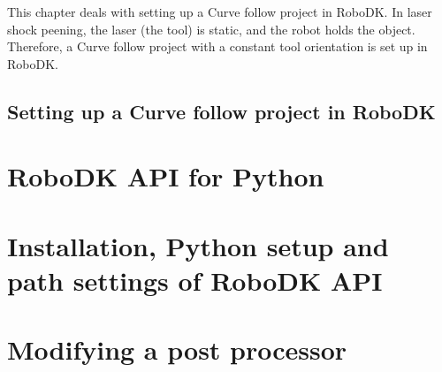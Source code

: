 This chapter deals with setting up a Curve follow project in RoboDK. In laser shock peening, the laser (the tool) is static, and the robot holds the object. Therefore, a Curve follow project with a constant tool orientation is set up in RoboDK.

\subsection{Setting up a Curve follow project in RoboDK}


\section{RoboDK API for Python}

\section{Installation, Python setup and path settings of RoboDK API}

\section{Modifying a post processor}


